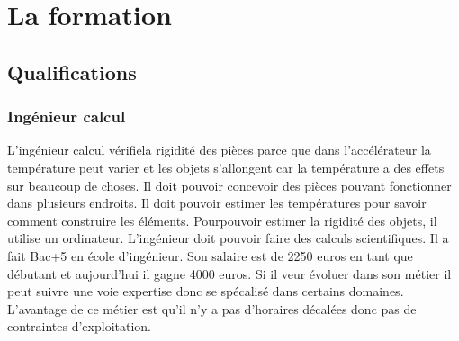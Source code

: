 
\chapter{La formation}

	
	\minitoc
	




			
	\section{Qualifications}

		
		\subsection{Ingénieur calcul}
			L'ingénieur calcul vérifiela rigidité des pièces parce que dans l'accélérateur la température peut varier et les objets s'allongent car la température a des effets sur beaucoup de choses. Il doit pouvoir concevoir des pièces pouvant fonctionner dans plusieurs endroits. Il doit pouvoir estimer les températures pour savoir comment construire les éléments. Pourpouvoir estimer la rigidité des objets, il utilise un ordinateur.
			L'ingénieur doit pouvoir faire des calculs scientifiques. Il a fait Bac+5 en école d'ingénieur. Son salaire est de 2250 euros en tant que débutant et aujourd'hui il gagne 4000 euros. Si il veur évoluer dans son métier il peut suivre une voie expertise donc se spécalisé dans certains domaines.
			L'avantage de ce métier est qu'il n'y a pas d'horaires décalées donc pas de contraintes d'exploitation.  
